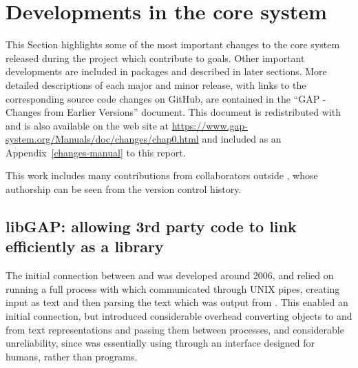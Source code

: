 \section{Developments in the core \GAP system}\label{sec:core-gap}

This Section highlights some of the most important
changes to the core \GAP system released
during the project which contribute to \ODK goals. Other important developments are
included in \GAP packages and described in later sections.  More
detailed descriptions of each major and minor \GAP release, with links
to the corresponding source code changes on GitHub, are contained in
the ``GAP - Changes from Earlier Versions'' document. This document is
redistributed with \GAP and is also available on the \GAP web site at
\url{https://www.gap-system.org/Manuals/doc/changes/chap0.html} and
included as an Appendix~\ref{changes-manual} to this report.

This work includes many contributions from collaborators outside \ODK,
whose authorship can be seen from the version control history.

\subsection{libGAP: allowing 3rd party code to link \GAP efficiently as a library}\label{libgap}

The initial connection between \Sage and \GAP was developed around
2006, and relied on running a full \GAP process with which \Sage
communicated through UNIX pipes, creating \GAP input as text and then parsing
the text which was output from \GAP. This enabled an initial connection, but
introduced considerable overhead converting objects to and from text
representations and passing them between processes, and considerable
unreliability, since \Sage was essentially using \GAP through an
interface designed for humans, rather than programs.


